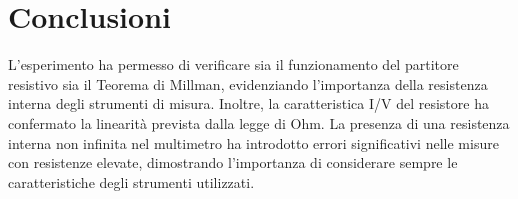 \documentclass[a4paper,6pt]{article}
\begin{document}
\newpage

\section{Conclusioni}
L'esperimento ha permesso di verificare sia il funzionamento del partitore resistivo sia il Teorema di Millman, evidenziando l'importanza della resistenza interna degli strumenti di misura. Inoltre, la caratteristica I/V del resistore ha confermato la linearità prevista dalla legge di Ohm. La presenza di una resistenza interna non infinita nel multimetro ha introdotto errori significativi nelle misure con resistenze elevate, dimostrando l'importanza di considerare sempre le caratteristiche degli strumenti utilizzati.
\end{document}
